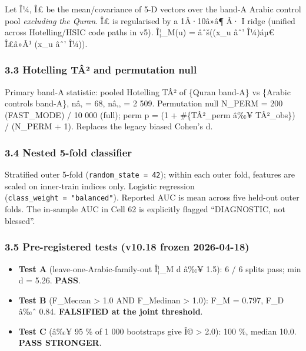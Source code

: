 \documentclass[
]{article}
\providecommand{\tightlist}{%
  \setlength{\itemsep}{0pt}\setlength{\parskip}{0pt}}
\begin{document}
Let Î¼, Î£ be the mean/covariance of 5-D vectors over the band-A Arabic
control pool \emph{excluding the Quran}. Î£ is regularised by a
1Â·10â»â¶ Â· I ridge (unified across Hotelling/HSIC code paths in v5).
Î¦\_M(u) = âˆš((x\_u âˆ' Î¼)áµ€ Î£â»Â¹ (x\_u âˆ' Î¼)).

\subsubsection{3.3 Hotelling TÂ² and permutation
null}\label{hotelling-tuxe2uxb2-and-permutation-null}

Primary band-A statistic: pooled Hotelling TÂ² of \{Quran band-A\} vs
\{Arabic controls band-A\}, nâ‚ = 68, nâ‚‚ = 2 509. Permutation null
N\_PERM = 200 (FAST\_MODE) / 10 000 (full); perm p = (1 + \#\{TÂ²\_perm
â‰¥ TÂ²\_obs\}) / (N\_PERM + 1). Replaces the legacy biased Cohen's d.

\subsubsection{3.4 Nested 5-fold
classifier}\label{nested-5-fold-classifier}

Stratified outer 5-fold (\texttt{random\_state\ =\ 42}); within each
outer fold, features are scaled on inner-train indices only. Logistic
regression (\texttt{class\_weight\ =\ "balanced"}). Reported AUC is mean
across five held-out outer folds. The in-sample AUC in Cell 62 is
explicitly flagged ``DIAGNOSTIC, not blessed''.

\subsubsection{3.5 Pre-registered tests (v10.18 frozen
2026-04-18)}\label{pre-registered-tests-v10.18-frozen-2026-04-18}

\begin{itemize}
\tightlist
\item
  \textbf{Test A} (leave-one-Arabic-family-out Î¦\_M d â‰¥ 1.5): 6 / 6
  splits pass; min d = 5.26. \textbf{PASS}.
\item
  \textbf{Test B} (F\_Meccan \textgreater{} 1.0 AND F\_Medinan
  \textgreater{} 1.0): F\_M = 0.797, F\_D â‰ˆ 0.84. \textbf{FALSIFIED at
  the joint threshold}.
\item
  \textbf{Test C} (â‰¥ 95 \% of 1 000 bootstraps give Î© \textgreater{}
  2.0): 100 \%, median 10.0. \textbf{PASS STRONGER}.
\end{itemize}
\end{document}
